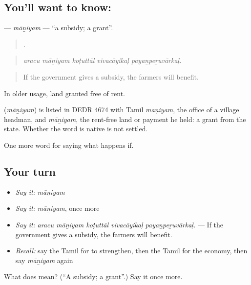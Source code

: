 \subsection*{You'll want to know: }
\textbf{} — \emph{māṉiyam} — \textquotedblleft{}a subsidy; a grant\textquotedblright{}.

\begin{quote}
    .
\end{quote}

\begin{quote}
\emph{aracu māṉiyam koṭuttāl vivacāyikaḷ payaṉpeṟuvārkaḷ.}
\end{quote}

\begin{quote}
If the government gives a subsidy, the farmers will benefit.
\end{quote}

In older usage, land granted free of rent.

\begin{cousinweb}
\textbf{} (\emph{māṉiyam}) is listed in DEDR 4674 with Tamil \emph{maṇiyam}, the office of a village headman, and \emph{māṉiyam}, the rent-free land or payment he held: a grant from the state. Whether the word is native is not settled.
\end{cousinweb}

\begin{grammarlens}[title={What you've built}]
One more word for saying what happens if.
\end{grammarlens}

\subsection*{Your turn}
\begin{itemize}
\raggedright
  \item \emph{Say it:} \emph{māṉiyam}
  \item \emph{Say it:} \emph{māṉiyam}, once more
  \item \emph{Say it:} \emph{aracu māṉiyam koṭuttāl vivacāyikaḷ payaṉpeṟuvārkaḷ.} — If the government gives a subsidy, the farmers will benefit.
  \item \emph{Recall:} say the Tamil for to strengthen, then the Tamil for the economy, then say \emph{māṉiyam} again
\end{itemize}

\begin{tcolorbox}[breakable,colback=teal!4,colframe=teal!35!black,title={Before you move on}]
What does  mean? (\textquotedblleft{}A subsidy; a grant\textquotedblright{}.) Say it once more.
\end{tcolorbox}
